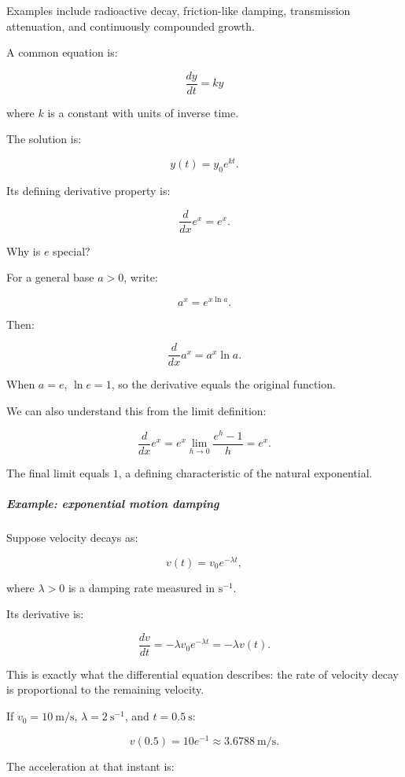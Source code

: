 Examples include radioactive decay, friction-like damping, transmission attenuation, and continuously compounded growth.

A common equation is:

\[
\frac{dy}{dt}=ky
\]

where \(k\) is a constant with units of inverse time.

The solution is:

\[
y(t)=y_0e^{kt}.
\]

Its defining derivative property is:

\[
\boxed{\frac d{dx}e^x=e^x}.
\]

Why is \(e\) special?

For a general base \(a>0\), write:

\[
a^x=e^{x\ln a}.
\]

Then:

\[
\boxed{\frac d{dx}a^x=a^x\ln a}.
\]

When \(a=e\), \(\ln e=1\), so the derivative equals the original function.

We can also understand this from the limit definition:

\[
\frac d{dx}e^x =e^x\lim_{h\to0}\frac{e^h-1}{h} =e^x.
\]

The final limit equals \(1\), a defining characteristic of the natural exponential.

\begin{allmightroleexample}

\subparagraph{Example: exponential motion damping}\label{01-foundations-i-ch020-example-exponential-motion-damping}

Suppose velocity decays as:

\end{allmightroleexample}

\[
v(t)=v_0e^{-\lambda t},
\]

where \(\lambda>0\) is a damping rate measured in \(\mathrm{s}^{-1}\).

Its derivative is:

\[
\frac{dv}{dt}=-\lambda v_0e^{-\lambda t} =-\lambda v(t).
\]

This is exactly what the differential equation describes: the rate of velocity decay is proportional to the remaining velocity.

If \(v_0=10\ \text{m/s}\), \(\lambda=2\ \mathrm{s}^{-1}\), and \(t=0.5\ \text{s}\):

\[
v(0.5)=10e^{-1}\approx3.6788\ \text{m/s}.
\]

The acceleration at that instant is:

